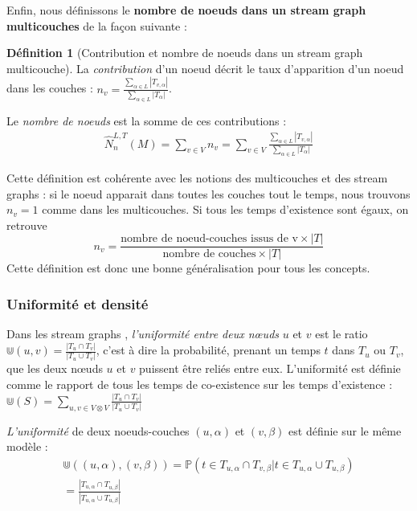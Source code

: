 \documentclass[11pt,a4paper]{article}
\theoremstyle{definition}
\newtheorem{defn}{Définition}
\theoremstyle{remark}
\theoremstyle{remark}
\begin{document}
   Enfin, nous définissons le \textbf{nombre de noeuds dans un stream graph multicouches} de la façon suivante : 
    
    \begin{defn}[Contribution et nombre de noeuds dans un stream graph multicouche]
    La {\em contribution} d'un noeud décrit le taux d'apparition d'un noeud dans les couches : $n_v = \frac{\sum_{\alpha \in L}|T_{v,\alpha}|}{\sum_{\alpha \in L} |T_{\alpha}|}$.
    
    Le {\em nombre de noeuds} est la somme de ces contributions :
    \begin{align}
    \hat{N}^{L,T}_n(M) = \sum_{v\in V} n_v= \sum_{v\in V} \frac{\sum_{\alpha \in L}|T_{v,\alpha}|}{\sum_{\alpha \in L} |T_{\alpha}|} 
    \label{numberNodes}
	\end{align}     
	
	\end{defn}
	
	Cette définition est cohérente avec les notions des multicouches et des stream graphs : si le noeud apparait dans toutes les couches tout le temps, nous trouvons $n_v=1$ comme dans les multicouches. Si tous les temps d'existence sont égaux, on retrouve $$n_v=\frac{\text{nombre de noeud-couches issus de v}\times |T|}{\text{nombre de couches}\times |T|}$$ Cette définition est donc une bonne généralisation pour tous les concepts.

	


	\subsubsection{Uniformité et densité}
	
	Dans les stream graphs \cite{stream}, {\em l'uniformité entre deux nœuds} $u$ et $v$ est le ratio $\Cup (u,v) = \frac{|T_u\cap T_v|}{|T_u \cup T_v|}$, c'est à dire la probabilité, prenant un temps $t$ dans $T_u$ ou $T_v$, que les deux nœuds $u$ et $v$ puissent être reliés entre eux. L'uniformité est définie comme le rapport de tous les temps de co-existence sur les temps d'existence : $
 \Cup(S)=\sum_{u,v \in V \otimes V}\frac{|T_u\cap T_v|}{|T_u\cup T_v|}
$
	
		
	{\em L'uniformité } de deux noeuds-couches $(u,\alpha)$ et $(v,\beta)$ est définie sur le même modèle :
	\begin{align*}
		\Cup((u,\alpha),(v,\beta))=\mathbb{P}( t \in T_{u,\alpha} \cap T_{v,\beta} | t \in T_{u,\alpha} \cup T_{u,\beta}) \\
		= \frac{|T_{u,\alpha}\cap T_{u,\beta}|}{|T_{u,\alpha}\cup T_{u,\beta}|}
	\end{align*}
\end{document}
